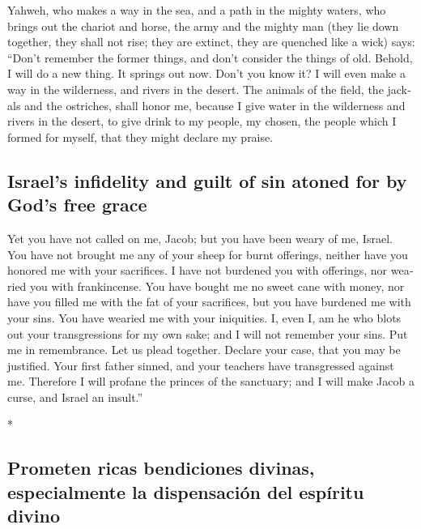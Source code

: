 \begin{paracol}{2}
\begin{otherlanguage}{english}
 Yahweh, who makes a way in the sea, and a path in the
mighty waters,  who brings out the chariot and horse, the
army and the mighty man (they lie down together, they shall not rise;
they are extinct, they are quenched like a wick) says: 
``Don't remember the former things, and don't consider the things of
old.  Behold, I will do a new thing. It springs out now.
Don't you know it? I will even make a way in the wilderness, and rivers
in the desert.  The animals of the field, the jackals and
the ostriches, shall honor me, because I give water in the wilderness
and rivers in the desert, to give drink to my people, my chosen,
 the people which I formed for myself, that they might
declare my praise.

\hypertarget{israels-infidelity-and-guilt-of-sin-atoned-for-by-gods-free-grace}{%
\subsection{Israel's infidelity and guilt of sin atoned for by God's
free
grace}\label{israels-infidelity-and-guilt-of-sin-atoned-for-by-gods-free-grace}}

 Yet you have not called on me, Jacob; but you have been
weary of me, Israel.  You have not brought me any of your
sheep for burnt offerings, neither have you honored me with your
sacrifices. I have not burdened you with offerings, nor wearied you with
frankincense.  You have bought me no sweet cane with
money, nor have you filled me with the fat of your sacrifices, but you
have burdened me with your sins. You have wearied me with your
iniquities.  I, even I, am he who blots out your
transgressions for my own sake; and I will not remember your sins.
 Put me in remembrance. Let us plead together. Declare
your case, that you may be justified.  Your first father
sinned, and your teachers have transgressed against me. 
Therefore I will profane the princes of the sanctuary; and I will make
Jacob a curse, and Israel an insult.''

\end{otherlanguage}

\switchcolumn[0]*

\hypertarget{prometen-ricas-bendiciones-divinas-especialmente-la-dispensaciuxf3n-del-espuxedritu-divino}{%
\subsection{Prometen ricas bendiciones divinas, especialmente la
dispensación del espíritu
divino}\label{prometen-ricas-bendiciones-divinas-especialmente-la-dispensaciuxf3n-del-espuxedritu-divino}}


\end{paracol}
